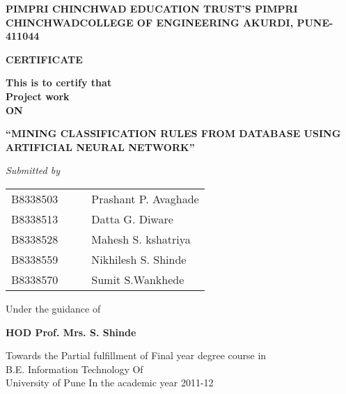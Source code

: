 \thispagestyle{empty}
\begin{titlepage}
\begin{center}
\Large{\bf{PIMPRI CHINCHWAD EDUCATION TRUST’S
PIMPRI CHINCHWADCOLLEGE OF ENGINEERING
AKURDI, PUNE-411044
\\}}
\end{center}
\begin{center}
\color{red}\Huge{\bf{CERTIFICATE\\}}	
\end{center}
\begin{center}
\bf{
This is to certify that\\
Project work\\
ON}
\end{center}
\begin{center}
\color{blue}\LARGE{\bf{``MINING CLASSIFICATION RULES FROM DATABASE USING ARTIFICIAL NEURAL NETWORK'' \\}}	
\end{center}
\begin{center}
\Large{\em{Submitted by\\}}
\begin{table}[htbp]\color{red}
	\begin{center}
	\begin{tabular}{ l c c l }
	\Large{B8338503} & & & \Large{Prashant  P. Avaghade} \\ 
	\Large{B8338513} & & & \Large{Datta G. Diware} \\
	\Large{B8338528} & & & \Large{Mahesh S. kshatriya} \\
	\Large{B8338559} & & & \Large{Nikhilesh S. Shinde} \\
      \Large{B8338570} & & & \Large{Sumit S.Wankhede} \\
	\end{tabular}
	\end{center}
	\end{table}


\Large{Under the guidance of\\ }\begin{center}
\color{red}\Large{\bf{HOD Prof. Mrs. S. Shinde}\\}\end{center}
\Large{Towards the Partial fulfillment of
Final year degree course in\\B.E. Information Technology
Of\\University of Pune
In the academic year
2011-12
\\}
\vspace{3pt}


\end{center}
\end{titlepage}
